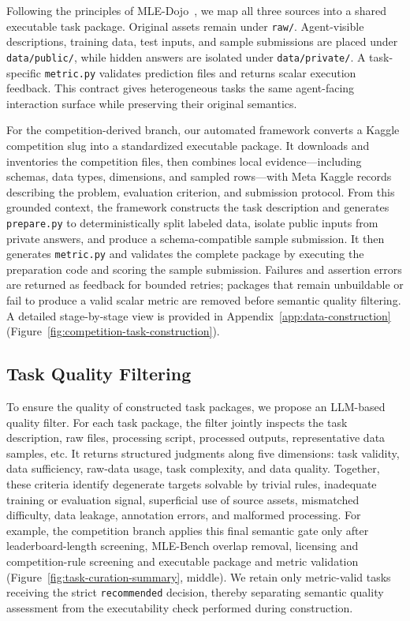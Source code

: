 Following the principles of MLE-Dojo~\citep{qiang2025mledojo}, we map all three sources into a shared executable task package. Original assets remain under \texttt{raw/}. Agent-visible descriptions, training data, test inputs, and sample submissions are placed under \texttt{data/public/}, while hidden answers are isolated under \texttt{data/private/}. A task-specific \texttt{metric.py} validates prediction files and returns scalar execution feedback. This contract gives heterogeneous tasks the same agent-facing interaction surface while preserving their original semantics.

For the competition-derived branch, our automated framework converts a Kaggle competition slug into a standardized executable package. It downloads and inventories the competition files, then combines local evidence---including schemas, data types, dimensions, and sampled rows---with Meta Kaggle records describing the problem, evaluation criterion, and submission protocol. From this grounded context, the framework constructs the task description and generates \texttt{prepare.py} to deterministically split labeled data, isolate public inputs from private answers, and produce a schema-compatible sample submission. It then generates \texttt{metric.py} and validates the complete package by executing the preparation code and scoring the sample submission. Failures and assertion errors are returned as feedback for bounded retries; packages that remain unbuildable or fail to produce a valid scalar metric are removed before semantic quality filtering. A detailed stage-by-stage view is provided in Appendix~\ref{app:data-construction} (Figure~\ref{fig:competition-task-construction}).

\subsection{Task Quality Filtering}
To ensure the quality of constructed task packages, we propose an LLM-based quality filter. For each task package, the filter jointly inspects the task description, raw files, processing script, processed outputs, representative data samples, etc. It returns structured judgments along five dimensions: task validity, data sufficiency, raw-data usage, task complexity, and data quality. Together, these criteria identify degenerate targets solvable by trivial rules, inadequate training or evaluation signal, superficial use of source assets, mismatched difficulty, data leakage, annotation errors, and malformed processing. For example, the competition branch applies this final semantic gate only after leaderboard-length screening, MLE-Bench overlap removal, licensing and competition-rule screening and executable package and metric validation (Figure~\ref{fig:task-curation-summary}, middle). We retain only metric-valid tasks receiving the strict \texttt{recommended} decision, thereby separating semantic quality assessment from the executability check performed during construction.

